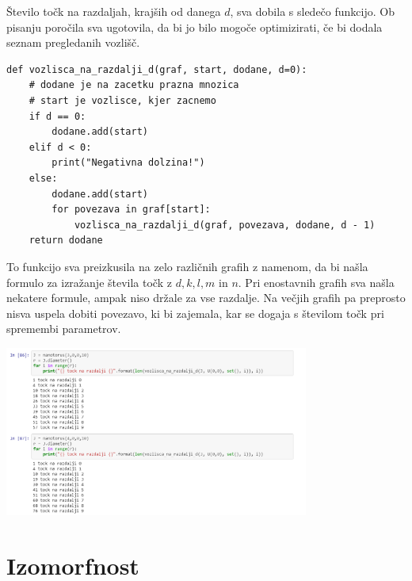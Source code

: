 \documentclass[a4paper, 11 pt]{article}
\begin{document}
Število točk na razdaljah, krajših od danega $d$, sva dobila s sledečo funkcijo. Ob pisanju poročila sva ugotovila, da bi jo bilo mogoče optimizirati, če bi dodala seznam pregledanih vozlišč.

\begin{verbatim}
def vozlisca_na_razdalji_d(graf, start, dodane, d=0):
    # dodane je na zacetku prazna mnozica
    # start je vozlisce, kjer zacnemo
    if d == 0:
        dodane.add(start)
    elif d < 0:
        print("Negativna dolzina!")
    else:
        dodane.add(start)
        for povezava in graf[start]:
            vozlisca_na_razdalji_d(graf, povezava, dodane, d - 1)
    return dodane
\end{verbatim}

\pagebreak

To funkcijo sva preizkusila na zelo različnih grafih z namenom, da bi našla formulo za izražanje števila točk z $d, k, l, m$ in $n$. Pri enostavnih grafih sva našla nekatere formule, ampak niso držale za vse razdalje. Na večjih grafih pa preprosto nisva uspela dobiti povezavo, ki bi zajemala, kar se dogaja s številom točk pri spremembi parametrov. 

\begin{center}
\includegraphics[width=10cm]{tocke}
\end{center}
\vspace{1cm}

\section{Izomorfnost}
\end{document}
